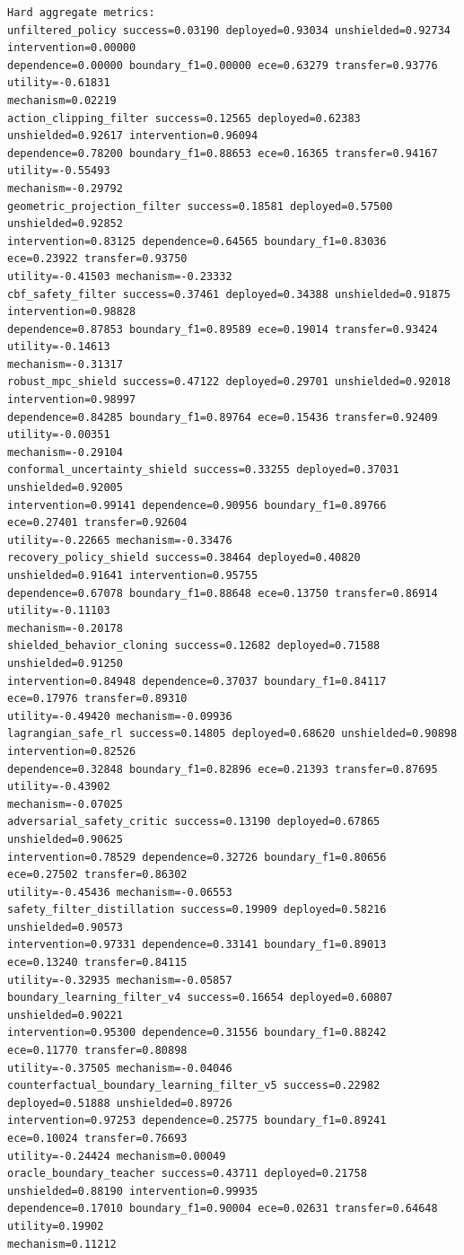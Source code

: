 \documentclass{article}
\begin{document}
\begin{tiny}
\begin{verbatim}
Hard aggregate metrics:
unfiltered_policy success=0.03190 deployed=0.93034 unshielded=0.92734 intervention=0.00000
dependence=0.00000 boundary_f1=0.00000 ece=0.63279 transfer=0.93776 utility=-0.61831
mechanism=0.02219
action_clipping_filter success=0.12565 deployed=0.62383 unshielded=0.92617 intervention=0.96094
dependence=0.78200 boundary_f1=0.88653 ece=0.16365 transfer=0.94167 utility=-0.55493
mechanism=-0.29792
geometric_projection_filter success=0.18581 deployed=0.57500 unshielded=0.92852
intervention=0.83125 dependence=0.64565 boundary_f1=0.83036 ece=0.23922 transfer=0.93750
utility=-0.41503 mechanism=-0.23332
cbf_safety_filter success=0.37461 deployed=0.34388 unshielded=0.91875 intervention=0.98828
dependence=0.87853 boundary_f1=0.89589 ece=0.19014 transfer=0.93424 utility=-0.14613
mechanism=-0.31317
robust_mpc_shield success=0.47122 deployed=0.29701 unshielded=0.92018 intervention=0.98997
dependence=0.84285 boundary_f1=0.89764 ece=0.15436 transfer=0.92409 utility=-0.00351
mechanism=-0.29104
conformal_uncertainty_shield success=0.33255 deployed=0.37031 unshielded=0.92005
intervention=0.99141 dependence=0.90956 boundary_f1=0.89766 ece=0.27401 transfer=0.92604
utility=-0.22665 mechanism=-0.33476
recovery_policy_shield success=0.38464 deployed=0.40820 unshielded=0.91641 intervention=0.95755
dependence=0.67078 boundary_f1=0.88648 ece=0.13750 transfer=0.86914 utility=-0.11103
mechanism=-0.20178
shielded_behavior_cloning success=0.12682 deployed=0.71588 unshielded=0.91250
intervention=0.84948 dependence=0.37037 boundary_f1=0.84117 ece=0.17976 transfer=0.89310
utility=-0.49420 mechanism=-0.09936
lagrangian_safe_rl success=0.14805 deployed=0.68620 unshielded=0.90898 intervention=0.82526
dependence=0.32848 boundary_f1=0.82896 ece=0.21393 transfer=0.87695 utility=-0.43902
mechanism=-0.07025
adversarial_safety_critic success=0.13190 deployed=0.67865 unshielded=0.90625
intervention=0.78529 dependence=0.32726 boundary_f1=0.80656 ece=0.27502 transfer=0.86302
utility=-0.45436 mechanism=-0.06553
safety_filter_distillation success=0.19909 deployed=0.58216 unshielded=0.90573
intervention=0.97331 dependence=0.33141 boundary_f1=0.89013 ece=0.13240 transfer=0.84115
utility=-0.32935 mechanism=-0.05857
boundary_learning_filter_v4 success=0.16654 deployed=0.60807 unshielded=0.90221
intervention=0.95300 dependence=0.31556 boundary_f1=0.88242 ece=0.11770 transfer=0.80898
utility=-0.37505 mechanism=-0.04046
counterfactual_boundary_learning_filter_v5 success=0.22982 deployed=0.51888 unshielded=0.89726
intervention=0.97253 dependence=0.25775 boundary_f1=0.89241 ece=0.10024 transfer=0.76693
utility=-0.24424 mechanism=0.00049
oracle_boundary_teacher success=0.43711 deployed=0.21758 unshielded=0.88190 intervention=0.99935
dependence=0.17010 boundary_f1=0.90004 ece=0.02631 transfer=0.64648 utility=0.19902
mechanism=0.11212


\end{verbatim}
\end{tiny}
\end{document}
